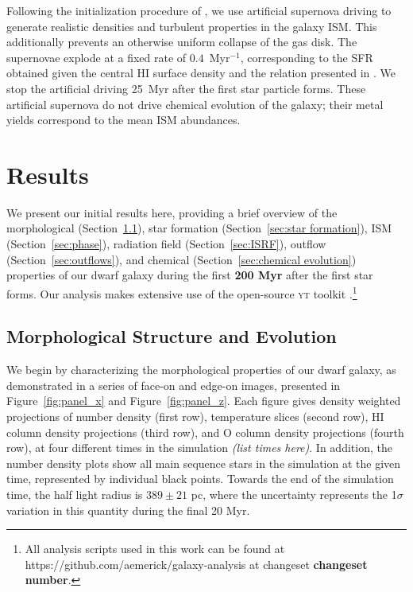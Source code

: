 \documentclass[twocolumn]{aastex61}
\begin{document}
Following the initialization procedure of \citet{Hu2017}, we use artificial supernova driving to generate realistic densities and turbulent properties in the galaxy ISM. This additionally prevents an otherwise uniform collapse of the gas disk. The supernovae explode at a fixed rate of $0.4$~Myr$^{-1}$, corresponding to the SFR obtained given the central HI surface density and the relation presented in \citep{Roychowdhury2009}. We stop the artificial driving 25~Myr after the first star particle forms. These artificial supernova do not drive chemical evolution of the galaxy; their metal yields correspond to the mean ISM abundances. 

\section{Results}
\label{sec:results}
We present our initial results here, providing a brief overview of the morphological (Section~\ref{sec:structure}), star formation (Section~\ref{sec:star formation}), ISM (Section~\ref{sec:phase}), radiation field (Section~\ref{sec:ISRF}), outflow (Section~\ref{sec:outflows}), and chemical (Section~\ref{sec:chemical evolution}) properties of our dwarf galaxy during the first \textbf{200 Myr} after the first star forms. Our analysis makes extensive use of the open-source \textsc{yt} toolkit \citep{yt}.\footnote{All analysis scripts used in this work can be found at https://github.com/aemerick/galaxy-analysis at changeset \textbf{changeset number}.}

\subsection{Morphological Structure and Evolution}
\label{sec:structure}

We begin by characterizing the morphological properties of our dwarf galaxy, as demonstrated in a series of face-on and edge-on images, presented in Figure~\ref{fig:panel_x} and Figure~\ref{fig:panel_z}. Each figure gives density weighted projections of number density (first row), temperature slices (second row), HI column density projections (third row), and O column density projections (fourth row), at four different times in the simulation \textit{(list times here)}. In addition, the number density plots show all main sequence stars in the simulation at the given time, represented by individual black points. Towards the end of the simulation time, the half light radius is $389 \pm 21$ pc, where the uncertainty represents the 1$\sigma$ variation in this quantity during the final 20 Myr.
\end{document}
